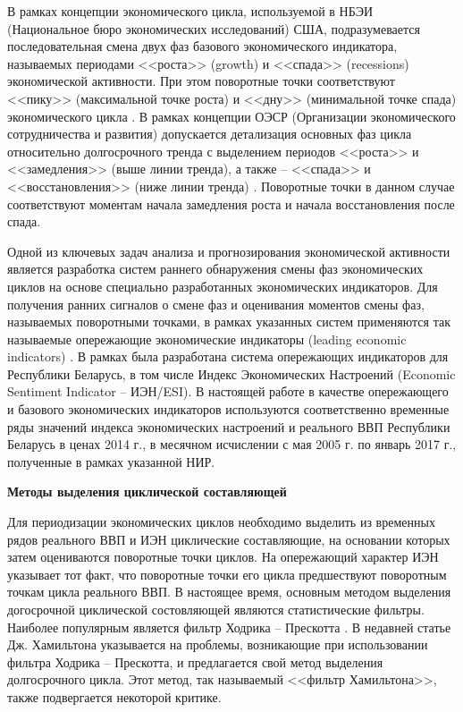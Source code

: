\documentclass[a4paper,14pt]{extreport}
\begin{document}
	В рамках концепции экономического цикла, используемой в НБЭИ (Национальное бюро экономических исследований) США, подразумевается последовательная смена двух фаз базового экономического индикатора, называемых периодами <<роста>> (growth)  и <<спада>> (recessions) экономической активности. При этом поворотные точки соответствуют <<пику>> (максимальной точке роста) и <<дну>> (минимальной точке спада) экономического цикла \cite{nberDevelopment}.  В рамках концепции ОЭСР (Организации экономического сотрудничества и развития) допускается  детализация основных фаз цикла относительно долгосрочного тренда с выделением периодов <<роста>> и <<замедления>> (выше линии тренда), а также  -- <<спада>> и <<восстановления>>  (ниже линии тренда) \cite{oecdCycleExtraction}. Поворотные точки в данном случае соответствуют моментам начала замедления роста и начала восстановления после спада. 
	
	Одной из ключевых задач анализа и прогнозирования экономической активности является разработка систем раннего обнаружения смены фаз экономических циклов на основе специально разработанных экономических индикаторов. Для получения ранних сигналов о смене фаз и оценивания моментов смены фаз, называемых поворотными точками, в рамках указанных систем применяются так называемые опережающие экономические индикаторы (leading economic indicators) \cite{oecdCLI}. В рамках \cite{esiMaking,esiMakingAlt,esiExtra} была разработана система опережающих индикаторов для Республики Беларусь, в том числе Индекс Экономических Настроений (Economic Sentiment Indicator -- ИЭН/ESI). В настоящей работе в качестве опережающего и базового экономических индикаторов используются соответственно временные ряды значений индекса экономических настроений и реального ВВП Республики Беларусь в ценах 2014 г., в месячном исчислении с мая 2005 г. по январь 2017 г., полученные в рамках указанной НИР.
	
	\bigskip
	\textbf{Методы выделения циклической составляющей}
	
	Для периодизации экономических циклов необходимо выделить из временных рядов реального ВВП и ИЭН циклические составляющие, на основании которых затем оцениваются поворотные точки циклов. На опережающий характер ИЭН указывает тот факт, что поворотные точки его цикла предшествуют поворотным точкам цикла реального ВВП. В настоящее время, основным методом выделения догосрочной циклической состовляющей являются статистические фильтры. Наиболее популярным является фильтр Ходрика -- Прескотта \cite{oecdCycleExtraction,estrellaFilterDo}.
	В недавней статье Дж. Хамильтона \cite{hamHP} указывается на проблемы, возникающие при использовании фильтра Ходрика -- Прескотта, и предлагается свой метод выделения долгосрочного цикла. Этот метод, так называемый <<фильтр Хамильтона>>, также подвергается некоторой критике.
	
\end{document}
